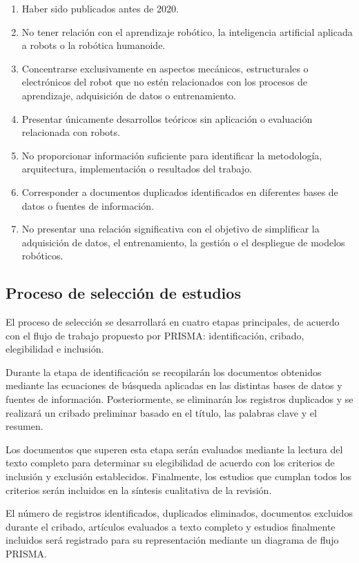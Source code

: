 \documentclass[stu,12pt,floatsintext]{apa7}
\begin{document}
\begin{enumerate}
\item Haber sido publicados antes de 2020.
\item No tener relación con el aprendizaje robótico, la inteligencia artificial aplicada a robots o la robótica humanoide.
\item Concentrarse exclusivamente en aspectos mecánicos, estructurales o electrónicos del robot que no estén relacionados con los procesos de aprendizaje, adquisición de datos o entrenamiento.
\item Presentar únicamente desarrollos teóricos sin aplicación o evaluación relacionada con robots.
\item No proporcionar información suficiente para identificar la metodología, arquitectura, implementación o resultados del trabajo.
\item Corresponder a documentos duplicados identificados en diferentes bases de datos o fuentes de información.
\item No presentar una relación significativa con el objetivo de simplificar la adquisición de datos, el entrenamiento, la gestión o el despliegue de modelos robóticos.
\end{enumerate}

\subsection{Proceso de selección de estudios}

El proceso de selección se desarrollará en cuatro etapas principales, de acuerdo con el flujo de trabajo propuesto por PRISMA: identificación, cribado, elegibilidad e inclusión.

Durante la etapa de identificación se recopilarán los documentos obtenidos mediante las ecuaciones de búsqueda aplicadas en las distintas bases de datos y fuentes de información. Posteriormente, se eliminarán los registros duplicados y se realizará un cribado preliminar basado en el título, las palabras clave y el resumen.

Los documentos que superen esta etapa serán evaluados mediante la lectura del texto completo para determinar su elegibilidad de acuerdo con los criterios de inclusión y exclusión establecidos. Finalmente, los estudios que cumplan todos los criterios serán incluidos en la síntesis cualitativa de la revisión.

El número de registros identificados, duplicados eliminados, documentos excluidos durante el cribado, artículos evaluados a texto completo y estudios finalmente incluidos será registrado para su representación mediante un diagrama de flujo PRISMA.
\end{document}
